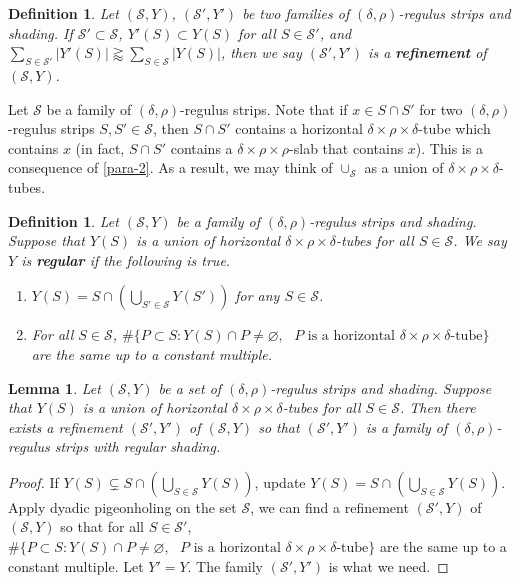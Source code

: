 \documentclass{amsart}%
\numberwithin{equation}{section}
\newtheorem{lemma}[theorem]{Lemma}
\newtheorem{definition}[theorem]{Definition}
\newcommand{\de}{\delta}
\newcommand{\cs}{\mathcal S}
\newcommand{\1}{\mathbbm{1}}
\begin{document}
\begin{definition}
Let $(\cs,Y)$, $(\cs',Y')$ be two families of $(\de,\rho)$-regulus strips and shading.
If $\cs'\subset\cs$, $Y'(S)\subset Y(S)$ for all $S\in\cs'$, 
and $\sum_{S\in\cs'}|Y'(S)|\gtrapprox\sum_{S\in\cs}|Y(S)|$,
then we say $(\cs',Y')$ is a {\bf refinement} of $(\cs,Y)$.
\end{definition}


Let $\cs$ be a family of $(\de,\rho)$-regulus strips. 
Note that if $x\in S\cap S'$ for two $(\de,\rho)$-regulus strips $S,S'\in\cs$, then $S\cap S'$ contains a horizontal $\de\times\rho\times\de$-tube which contains $x$ (in fact, $S\cap S'$ contains a $\de\times\rho\times\rho$-slab that contains $x$).
This is a consequence of \eqref{para-2}.
As a result, we may think of $\cup_{\cs}$ as a union of $\de\times\rho\times\de$-tubes.

\begin{definition}\label{regularShadingDef}
Let $(\cs,Y)$ be a family of $(\de,\rho)$-regulus strips and shading. 
Suppose that $Y(S)$ is a union of horizontal $\de\times\rho\times\de$-tubes for all $S\in\cs$.
We say $Y$ is {\bf regular} if the following is true.
\begin{enumerate}
    \item $Y(S)=S\cap(\bigcup_{S'\in\cs}Y(S'))$ for any $S\in\cs$.
    \item For all $S\in\cs$, $\#\{P\subset S: Y(S)\cap P\not=\varnothing, \text{ $P$ is a horizontal $\de\times\rho\times\de$-tube}\}$ are the same up to a constant multiple.
\end{enumerate}

\end{definition}



\begin{lemma}\label{lemRegularShading}
Let $(\cs, Y)$ be a set of $(\de,\rho)$-regulus strips and shading. 
Suppose that $Y(S)$ is a union of horizontal $\de\times\rho\times\de$-tubes for all $S\in\cs$.
Then there exists a refinement $(\cs',Y')$ of $(\cs,Y)$ so that $(\cs',Y')$ is a family of $(\de,\rho)$-regulus strips with regular shading.
\end{lemma}
\begin{proof}
If $Y(S)\subsetneq S\cap(\bigcup_{S\in\cs}Y(S))$, update $Y(S)=S\cap(\bigcup_{S\in\cs}Y(S))$.
Apply dyadic pigeonholing on the set $\cs$, we can find a refinement $(\cs',Y)$ of $(\cs,Y)$ so that for all $S\in\cs'$, $\#\{P\subset S: Y(S)\cap P\not=\varnothing, \text{ $P$ is a horizontal $\de\times\rho\times\de$-tube}\}$  are the same up to a constant multiple.
Let $Y'=Y$. 
The family $(\cs',Y')$ is what we need.
\qedhere

\end{proof}
\end{document}

